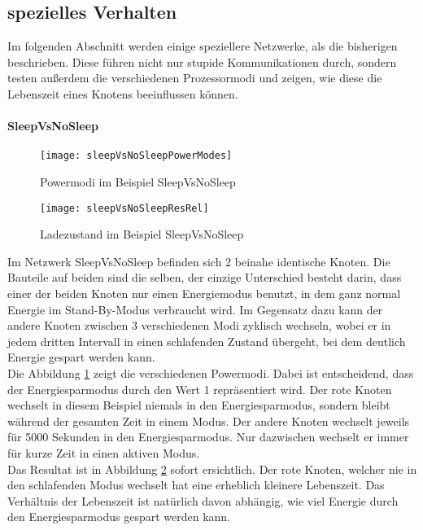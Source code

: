 \subsection*{spezielles Verhalten}

Im folgenden Abschnitt werden einige speziellere Netzwerke, als die bisherigen beschrieben. Diese führen nicht nur stupide Kommunikationen durch, sondern testen außerdem die verschiedenen Prozessormodi und zeigen, wie diese die Lebenszeit eines Knotens beeinflussen können.

\paragraph{SleepVsNoSleep}

\begin{figure}[htbp]
\centering
\caption{Powermodi im Beispiel SleepVsNoSleep}
\label{fig:sleepVsNoSleepPowerModes}
\texttt{[image: sleepVsNoSleepPowerModes]}
\end{figure}

\begin{figure}[htbp]
\centering
\caption{Ladezustand im Beispiel SleepVsNoSleep}
\label{fig:sleepVsNoSleepResRel}
\texttt{[image: sleepVsNoSleepResRel]}
\end{figure}

Im Netzwerk SleepVsNoSleep befinden sich 2 beinahe identische Knoten. Die Bauteile auf beiden sind die selben, der einzige Unterschied besteht darin, dass einer der beiden Knoten nur einen Energiemodus benutzt, in dem ganz normal Energie im Stand-By-Modus verbraucht wird. Im Gegensatz dazu kann der andere Knoten zwischen 3 verschiedenen Modi zyklisch wechseln, wobei er in jedem dritten Intervall in einen schlafenden Zustand übergeht, bei dem deutlich Energie gespart werden kann.\\
Die Abbildung \ref{fig:sleepVsNoSleepPowerModes} zeigt die verschiedenen Powermodi. Dabei ist entscheidend, dass der Energiesparmodus durch den Wert 1 repräsentiert wird. Der rote Knoten wechselt in diesem Beispiel niemals in den Energiesparmodus, sondern bleibt während der gesamten Zeit in einem Modus. Der andere Knoten wechselt jeweils für 5000 Sekunden in den Energiesparmodus. Nur dazwischen wechselt er immer für kurze Zeit in einen aktiven Modus.\\
Das Resultat ist in Abbildung \ref{fig:sleepVsNoSleepResRel} sofort ersichtlich. Der rote Knoten, welcher nie in den schlafenden Modus wechselt hat eine erheblich kleinere Lebenszeit. Das Verhältnis der Lebenszeit ist natürlich davon abhängig, wie viel Energie durch den Energiesparmodus gespart werden kann.

